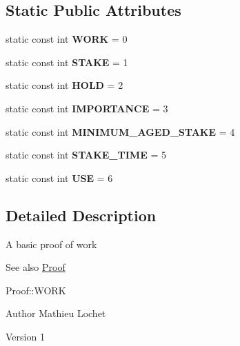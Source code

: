 \subsection*{Static Public Attributes}
\begin{DoxyCompactItemize}
\item 
\mbox{\label{classProof_a457d231986439ee6bcc945daacfc28fc}} 
static const int {\bfseries W\+O\+RK} = 0
\item 
\mbox{\label{classProof_acf157976c3c86ef2fd0e838b8c4ac992}} 
static const int {\bfseries S\+T\+A\+KE} = 1
\item 
\mbox{\label{classProof_ae5c2a86640bf558ff5625157e23b3eec}} 
static const int {\bfseries H\+O\+LD} = 2
\item 
\mbox{\label{classProof_a4e71a5e5928900794353acdd169ca652}} 
static const int {\bfseries I\+M\+P\+O\+R\+T\+A\+N\+CE} = 3
\item 
\mbox{\label{classProof_a1a08ffc465f4fcfde396d4c4feb22eb0}} 
static const int {\bfseries M\+I\+N\+I\+M\+U\+M\+\_\+\+A\+G\+E\+D\+\_\+\+S\+T\+A\+KE} = 4
\item 
\mbox{\label{classProof_a1aa2cb91c5be4ca021714ff6fc01da4a}} 
static const int {\bfseries S\+T\+A\+K\+E\+\_\+\+T\+I\+ME} = 5
\item 
\mbox{\label{classProof_a3f6898fa1d652d32182c3c387c8e979c}} 
static const int {\bfseries U\+SE} = 6
\end{DoxyCompactItemize}


\subsection{Detailed Description}
A basic proof of work \begin{DoxySeeAlso}{See also}
\mbox{\hyperlink{classProof}{Proof}} 

Proof\+::\+W\+O\+RK
\end{DoxySeeAlso}
\begin{DoxyAuthor}{Author}
Mathieu Lochet 
\end{DoxyAuthor}
\begin{DoxyVersion}{Version}
1 
\end{DoxyVersion}


